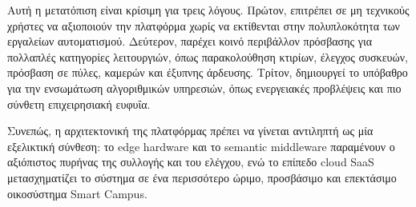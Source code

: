 Αυτή η μετατόπιση είναι κρίσιμη για τρεις λόγους. Πρώτον, επιτρέπει σε μη τεχνικούς χρήστες να αξιοποιούν την πλατφόρμα χωρίς να εκτίθενται στην πολυπλοκότητα των εργαλείων αυτοματισμού. Δεύτερον, παρέχει κοινό περιβάλλον πρόσβασης για πολλαπλές κατηγορίες λειτουργιών, όπως παρακολούθηση κτιρίων, έλεγχος συσκευών, πρόσβαση σε πύλες, καμερών και έξυπνης άρδευσης. Τρίτον, δημιουργεί το υπόβαθρο για την ενσωμάτωση αλγοριθμικών υπηρεσιών, όπως ενεργειακές προβλέψεις και πιο σύνθετη επιχειρησιακή ευφυΐα.

Συνεπώς, η αρχιτεκτονική της πλατφόρμας πρέπει να γίνεται αντιληπτή ως μία εξελικτική σύνθεση: το \textlatin{edge hardware} και το \textlatin{semantic middleware} παραμένουν ο αξιόπιστος πυρήνας της συλλογής και του ελέγχου, ενώ το επίπεδο \textlatin{cloud SaaS} μετασχηματίζει το σύστημα σε ένα περισσότερο ώριμο, προσβάσιμο και επεκτάσιμο οικοσύστημα \textlatin{Smart Campus}.




